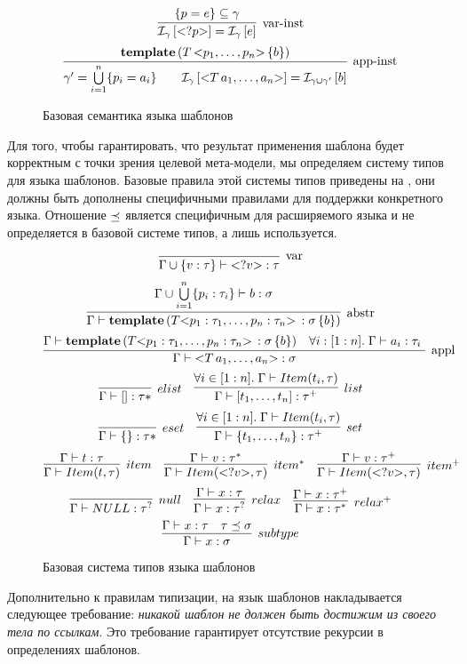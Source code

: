 \begin{figure}[htbp]
	\centering
$$
\trule{
	\{p = e\} \subseteq \gamma
}{
	\Inst{\gamma}{\ang{?p}} = \Inst{\gamma}{e}
}{var-inst}
$$ 
$$
\trule{
	\mathbf{template}\left(
		T \, \ang{p_1, \ldots, p_n} \, \{ b \}
	\right)
}{
	\gamma' = \bigcup\limits_{i=1}^{n} \{ p_i = a_i \}
	\qquad
	\Inst{\gamma}{\ang{T \, a_1, \ldots, a_n}} = \Inst{\gamma \cup \gamma'}{b}
}{app-inst}
$$
	\caption{Базовая семантика языка шаблонов}\label{TempSem}
\end{figure}



Для того, чтобы гарантировать, что результат применения шаблона будет корректным с точки зрения целевой мета-модели, мы определяем систему типов для языка шаблонов. Базовые правила этой системы типов приведены на , они должны быть дополнены специфичными правилами для поддержки конкретного языка. Отношение $\preceq$ является специфичным для расширяемого языка и не определяется в базовой системе типов, а лишь используется.

\begin{figure}[htbp]
	\centering
$$
\trule{}{\Gamma \cup \{v : \tau\} \vdash \ang{?v} : \tau}{var}
$$ 
$$
\trule{
	\Gamma \cup \bigcup\limits_{i=1}^{n} \{ p_i : \tau_i \} \vdash b : \sigma
}{
	\Gamma \vdash \mathbf{template}\left(
		T \ang{p_1 : \tau_1, \ldots, p_n : \tau_n} \,: \sigma \, \{ b \}
	\right)
}{abstr}
$$ 
$$
\trule{
	\Gamma \vdash \mathbf{template}\left(
		T \ang{p_1 : \tau_1, \ldots, p_n : \tau_n} \,: \sigma \, \{ b \}
	\right)
	&
	\forall i : [1:n].\; \Gamma \vdash a_i : \tau_i \
}{
	\Gamma \vdash \ang{T \, a_1, \ldots, a_n} : \sigma
}{appl}
$$
$$
\infer[elist]{\Gamma \vdash [] : \tau*}{}
\quad
\infer[list]{
	\Gamma \vdash [t_1,\ldots,t_n] : \tau^+
}{
	\forall i \in [1:n].\; \Gamma \vdash Item(t_i, \tau)
}
$$
$$
\infer[eset]{\Gamma \vdash \{\} : \tau*}{}
\quad
\infer[set]{
	\Gamma \vdash \{t_1,\ldots,t_n\} : \tau^+
}{
	\forall i \in [1:n].\; \Gamma \vdash Item(t_i, \tau)
}
$$
$$
\infer[item]{
	\Gamma \vdash Item(t, \tau)
}{
	\Gamma \vdash t : \tau
}
\quad
\infer[item^*]{
	\Gamma \vdash Item(\ang{?v}, \tau)
}{
	\Gamma \vdash v : \tau^*
}
\quad
\infer[item^+]{
	\Gamma \vdash Item(\ang{?v}, \tau)
}{
	\Gamma \vdash v : \tau^+
}
$$
$$
\infer[null]{
	\Gamma \vdash NULL : \tau^?
}{}
\quad
\infer[relax]{
	\Gamma \vdash x : \tau^?
}{
	\Gamma \vdash x : \tau
}
\quad
\infer[relax^+]{
	\Gamma \vdash x : \tau^*
}{
	\Gamma \vdash x : \tau^+
}
$$
$$
\infer[subtype]{
	\Gamma \vdash x : \sigma
}{
	\Gamma \vdash x : \tau &
	\tau \subtype \sigma
}
$$
	\caption{Базовая система типов языка шаблонов}\label{TempTypes}
\end{figure}
Дополнительно к правилам типизации, на язык шаблонов накладывается следующее требование: \emph{никакой шаблон не должен быть достижим из своего тела по ссылкам}. Это требование гарантирует отсутствие рекурсии в определениях шаблонов.

